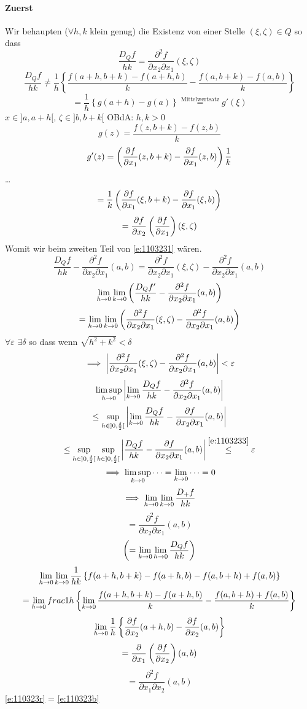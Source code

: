 \begin{Bew}
  \paragraph{Zuerst}
  Wir behaupten ($\forall h,k$ klein genug) die Existenz von einer Stelle $(\xi,\zeta)\in Q$ so dass
  \begin{equation}
    \label{e:1103231}
    \frac{D_Qf}{hk}=\frac{\partial^2f}{\partial x_2\partial x_1}(\xi, \zeta)
  \end{equation}
  \[\frac{D_Qf}{hk}\neq \frac{1}{h}\left\{ \frac{f(a+h,b+k)-f(a+h,b)}{k}-\frac{f(a,b+k)-f(a,b)}{k} \right\}\]
  \[=\frac{1}{h}\left\{ g(a+h)-g(a) \right\}\stackrel{\text{Mittelwertsatz}}{=}g'(\xi)\]
  $x\in ]a,a+h[$, $\zeta\in]b,b+k[$ OBdA: $h,k>0$
  \[g(z)=\frac{f(z,b+k)-f(z,b)}{k}\]
  \[g'(z)=\left( \dfrac{\partial f}{\partial x_1}(z,b+k)-\dfrac{\partial f}{\partial x_1}(z,b) \right)\frac{1}{k}\]
  \ldots
  \[=\frac{1}{k}\left( \dfrac{\partial f}{\partial x_1}(\xi,b+k)-\dfrac{\partial f}{\partial x_1}(\xi,b) \right)\]
  \[=\dfrac{\partial f}{\partial x_2}\left( \dfrac{\partial f}{\partial x_1} \right)(\xi,\zeta)\]
  Womit wir beim zweiten Teil von \ref{e:1103231} wären.
  \[\frac{D_Qf}{hk}-\frac{\partial^2f}{\partial x_2\partial x_1}(a,b)=\frac{\partial^2f}{\partial x_2\partial x_1}(\xi,\zeta)-\frac{\partial^2f}{\partial x_2\partial x_1}(a,b)\]
  \[\displaystyle\lim_{h\rightarrow0}\displaystyle\lim_{k\rightarrow0}\left( \frac{D_Qf'}{hk}-\frac{\partial^2f}{\partial x_2\partial x_1}(a,b) \right)\]
  \[=\displaystyle\lim_{h\rightarrow0}\displaystyle\lim_{k\rightarrow0}\left( \frac{\partial^2f}{\partial x_2\partial x_1}(\xi,\zeta)-\frac{\partial^2 f}{\partial x_2\partial x_1}(a,b) \right)\]
  $\forall \varepsilon$ $\exists \delta$ so dass wenn $\sqrt{h^2+k^2}<\delta$
  \begin{equation}
    \label{e:1103233}
    \implies \left| \frac{\partial^2f}{\partial x_2\partial x_1}(\xi,\zeta)-\frac{\partial^2f}{\partial x_2\partial x_1}(a,b) \right|<\varepsilon
  \end{equation}
  \[\limsup_{h\rightarrow 0}\left| \displaystyle\lim_{k\rightarrow0}\frac{D_Qf}{hk}-\frac{\partial^2 f}{\partial x_2\partial x_1}(a,b) \right|\]
  \[\leq \sup_{h\in ]0,\frac{\delta}{2}[}\left| \displaystyle\lim_{k\rightarrow0}\frac{D_Qf}{hk}-\frac{\partial f}{\partial x_2 \partial x_1}(a,b) \right|\]
  \[\leq \sup_{h\in ]0,\frac{\delta}{2}[}\sup_{k\in ]0,\frac{\delta}{2}[}\left| \frac{D_Qf}{hk}-\frac{\partial f}{\partial x_2 \partial x_1}(a,b) \right|\stackrel{\ref{e:1103233}}{\leq} \varepsilon\]
  \[\implies \limsup_{k\rightarrow 0}\cdots=\displaystyle\lim_{k\rightarrow0}\cdots=0\]
  \[\implies\displaystyle\lim_{h\rightarrow0}\displaystyle\lim_{k\rightarrow0}\frac{D_+f}{hk}\]
  \begin{equation}
    \label{e:110323r}
    =\frac{\partial^2f}{\partial x_2\partial x_1}(a,b)
  \end{equation}
  \[\left( =\displaystyle\lim_{k\rightarrow0}\displaystyle\lim_{h\rightarrow0}\frac{D_Qf}{hk} \right)\]
  \[\displaystyle\lim_{h\rightarrow0}\displaystyle\lim_{k\rightarrow0}\frac{1}{hk}\left\{ f(a+h,b+k)-f(a+h,b)-f(a,b+h)+f(a,b) \right\}\]
  \[=\displaystyle\lim_{h\rightarrow0}\\frac{1}{h}\left\{ \displaystyle\lim_{k\rightarrow0} \frac{f(a+h,b+k)-f(a+h,b)}{k}-\frac{f(a,b+h)+f(a,b)}{k} \right\}\]
  \[\displaystyle\lim_{h\rightarrow0}\frac{1}{h}\left\{ \dfrac{\partial f}{\partial x_2}(a+h,b)-\dfrac{\partial f}{\partial x_2}(a,b) \right\}\]
  \[=\dfrac{\partial }{\partial x_1}\left( \dfrac{\partial f}{\partial x_2} \right)(a,b)\]
  \begin{equation}
    \label{e:110323b}
    =\frac{\partial^2f}{\partial x_1\partial x_2}(a,b)
  \end{equation}
  \ref{e:110323r} = \ref{e:110323b}
\end{Bew}
